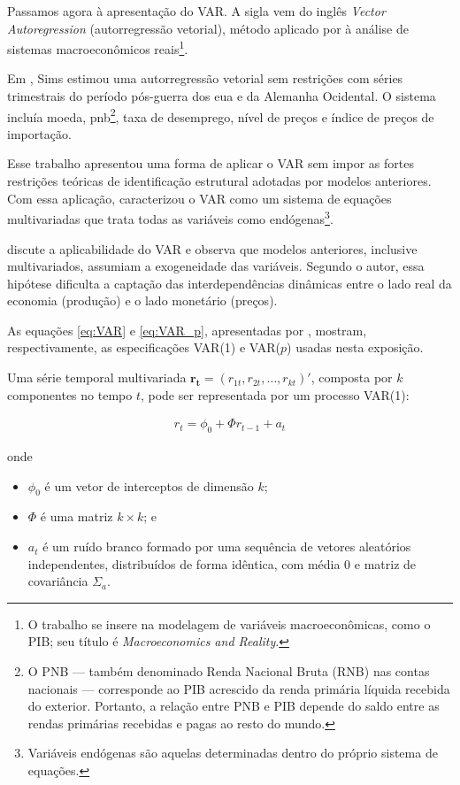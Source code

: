 Passamos agora à apresentação do VAR. A sigla vem do inglês \textit{Vector Autoregression} (autorregressão vetorial), método aplicado por  à análise de sistemas macroeconômicos reais\footnote{O trabalho se insere na modelagem de variáveis macroeconômicas, como o PIB; seu título é \textit{Macroeconomics and Reality}.}.

Em , Sims estimou uma autorregressão vetorial sem restrições com séries trimestrais do período pós-guerra dos \ac{eua} e da Alemanha Ocidental. O sistema incluía moeda, \ac{pnb}\footnote{O PNB — também denominado Renda Nacional Bruta (RNB) nas contas nacionais — corresponde ao PIB acrescido da renda primária líquida recebida do exterior. Portanto, a relação entre PNB e PIB depende do saldo entre as rendas primárias recebidas e pagas ao resto do mundo.}, taxa de desemprego, nível de preços e índice de preços de importação.

Esse trabalho apresentou uma forma de aplicar o VAR sem impor as fortes restrições teóricas de identificação estrutural adotadas por modelos anteriores. Com essa aplicação,  caracterizou o VAR como um sistema de equações multivariadas que trata todas as variáveis como endógenas\footnote{Variáveis endógenas são aquelas determinadas dentro do próprio sistema de equações.}.

 discute a aplicabilidade do VAR e observa que modelos anteriores, inclusive multivariados, assumiam a exogeneidade das variáveis. Segundo o autor, essa hipótese dificulta a captação das interdependências dinâmicas entre o lado real da economia (produção) e o lado monetário (preços).

As equações \ref{eq:VAR} e \ref{eq:VAR_p}, apresentadas por , mostram, respectivamente, as especificações VAR(1) e VAR($p$) usadas nesta exposição.

Uma série temporal multivariada $\mathbf{r_t} = (r_{1t}, r_{2t},\ldots,r_{kt})'$, composta por $k$ componentes no tempo $t$, pode ser representada por um processo VAR(1):

\begin{align}
	\label{eq:VAR}
	r_t = \phi_0 + \varPhi r_{t-1} + a_t
\end{align}

onde
\begin{itemize}
	\item[a)] $\phi_0$ é um vetor de interceptos de dimensão $k$;
	\item[b)] $\varPhi$ é uma matriz $ k \times k$; e
	\item[c)] $a_t$ é um ruído branco formado por uma sequência de vetores aleatórios independentes, distribuídos de forma idêntica, com média 0 e matriz de covariância $\Sigma_a$.
\end{itemize}

